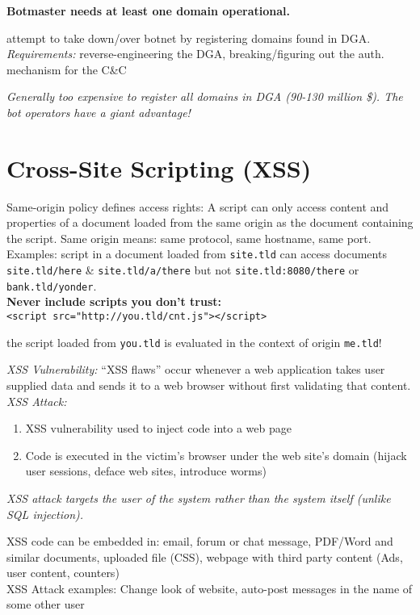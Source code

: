 \textbf{Botmaster needs at least one domain operational.}

 attempt to take down/over botnet by registering domains found in DGA.\\
\emph{Requirements:} reverse-engineering the DGA, breaking/figuring out the auth. mechanism for the C\&C

\textit{Generally too expensive to register all domains in DGA (90-130 million \$). The bot operators have a giant advantage!}

\section{Cross-Site Scripting (XSS)}

 Same-origin policy defines access rights: A script can
only access content and properties of a document loaded from the same origin as the document containing the script. Same origin means: same protocol, same hostname, same port.\\ Examples: script in a document loaded from {\tt site.tld} can access documents {\tt site.tld/here} \& {\tt site.tld/a/there} but not {\tt site.tld:8080/there} or {\tt bank.tld/yonder}.\\
\textbf{Never include scripts you don't trust:} \\
{\tt <script src="http://you.tld/cnt.js"></script>}

the script loaded from {\tt you.tld} is evaluated in the context of origin {\tt me.tld}! 

 \textit{XSS Vulnerability:} ``XSS flaws'' occur whenever a web application takes user supplied data and sends it to a web browser without first validating that content.\\
\textit{XSS Attack:} 
\begin{enumerate}
\item XSS vulnerability used to inject code into a web page
\item Code is executed in the victim's browser under the web site's domain (hijack user sessions, deface web sites, introduce worms)
\end{enumerate}

\textit{XSS attack targets the user of the system rather than the system itself (unlike SQL injection).}

 XSS code can be embedded in: email, forum or chat message, PDF/Word and similar documents, uploaded file (CSS), webpage with third party content (Ads, user content, counters) \\
XSS Attack examples: Change look of website, auto-post messages in the name of some other user

